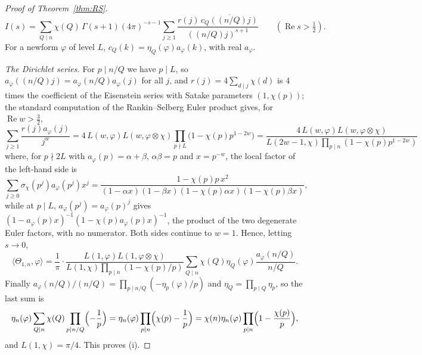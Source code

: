 ﻿\documentclass[11pt]{amsart}
\theoremstyle{remark}
\begin{document}
\begin{proof}[Proof of Theorem~\ref{thm:RS}]
\begin{equation}\label{eq:Is}
I(s)=\sum_{Q\mid n}\chi(Q)\,\Gamma(s+1)(4\pi)^{-s-1}\sum_{j\ge1}\frac{r(j)\,\overline{c_Q((n/Q)j)}}{((n/Q)j)^{s+1}}\qquad(\operatorname{Re}s>\tfrac12).
\end{equation}
For a newform $\varphi$ of level $L$, $c_Q(k)=\eta_Q(\varphi)a_\varphi(k)$, with real $a_\varphi$.

\emph{The Dirichlet series.} For $p\mid n/Q$ we have $p\mid L$, so $a_\varphi((n/Q)j)=a_\varphi(n/Q)a_\varphi(j)$ for all $j$, and $r(j)=4\sum_{d\mid j}\chi(d)$ is $4$ times the coefficient of the Eisenstein series with Satake parameters $(1,\chi(p))$; the standard computation of the Rankin--Selberg Euler product gives, for $\operatorname{Re}w>\frac32$,
\[
\sum_{j\ge1}\frac{r(j)a_\varphi(j)}{j^{w}}=4\,L(w,\varphi)L(w,\varphi\otimes\chi)\prod_{p\nmid L}\bigl(1-\chi(p)p^{1-2w}\bigr)=\frac{4\,L(w,\varphi)L(w,\varphi\otimes\chi)}{L(2w-1,\chi)\prod_{p\mid n}(1-\chi(p)p^{1-2w})}
\]
where, for $p\nmid 2L$ with $a_\varphi(p)=\alpha+\beta$, $\alpha\beta=p$ and $x=p^{-w}$, the local factor of the left-hand side is
\[
\sum_{j\ge0}\sigma_\chi(p^j)a_\varphi(p^j)x^j=\frac{1-\chi(p)p\,x^2}{(1-\alpha x)(1-\beta x)(1-\chi(p)\alpha x)(1-\chi(p)\beta x)},
\]
while at $p\mid L$, $a_\varphi(p^j)=a_\varphi(p)^j$ gives $(1-a_\varphi(p)x)^{-1}(1-\chi(p)a_\varphi(p)x)^{-1}$, the product of the two degenerate Euler factors, with no numerator. Both sides continue to $w=1$. Hence, letting $s\to0$,
\[
\langle\Theta_{1,n},\varphi\rangle=\frac1\pi\cdot\frac{L(1,\varphi)L(1,\varphi\otimes\chi)}{L(1,\chi)\prod_{p\mid n}(1-\chi(p)/p)}\sum_{Q\mid n}\chi(Q)\eta_Q(\varphi)\frac{a_\varphi(n/Q)}{n/Q}.
\]
Finally $a_\varphi(n/Q)/(n/Q)=\prod_{p\mid n/Q}(-\eta_p(\varphi)/p)$ and $\eta_Q=\prod_{p\mid Q}\eta_p$, so the last sum is
\[
\eta_n(\varphi)\sum_{Q\mid n}\chi(Q)\prod_{p\mid n/Q}\Bigl(-\frac1p\Bigr)=\eta_n(\varphi)\prod_{p\mid n}\Bigl(\chi(p)-\frac1p\Bigr)=\chi(n)\eta_n(\varphi)\prod_{p\mid n}\Bigl(1-\frac{\chi(p)}p\Bigr),
\]
and $L(1,\chi)=\pi/4$. This proves (i).


\end{proof}
\end{document}
